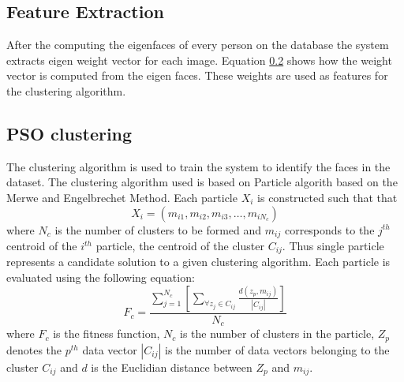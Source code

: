 \documentclass[a4paper,twoside]{article}
\begin{document}
\subsection{Feature Extraction}

After the computing the eigenfaces of every person on the database the system
extracts eigen weight vector for each image. Equation \ref{} shows how the
weight vector is computed from the eigen faces. These weights are used as
features for the clustering algorithm.


\subsection{PSO clustering}
The clustering algorithm is used to train the system to identify the faces in
the dataset. The clustering algorithm used is based on Particle algorith based
on the Merwe and Engelbrechet \cite{psoclustering} Method. Each particle
$X_i$ is constructed such that that
\begin{equation}
X_i=\left( m_{i1}, m_{i2}, m_{i3},\dots, m_{iN_c}\right)
\end{equation}
where $N_c$ is the number of clusters to be formed and $m_{ij}$ corresponds to the $j^{th}$ centroid of the  $i^{th}$ particle, the centroid of the cluster $C_{ij}$. Thus single particle represents a candidate solution to a given clustering algorithm. Each particle is evaluated using the following equation:
\begin{equation}
F_c  = \frac{{\sum\nolimits_{j = 1}^{N_c } {\left[ {\sum\limits_{\forall z_j  \in C_{ij} } {\frac{{d(z_p ,m_{ij} )}}{{\left| {C_{ij} } \right|}}} } \right]} }}{{N_c }}
\end{equation}
where $F_c$ is the fitness function, $N_c$ is the number of clusters in the particle, $Z_p$ denotes the $p^{th}$ data vector $\left| {C_{ij} } \right|$ is the number of data vectors belonging to the cluster $C_{ij}$ and $d$ is the Euclidian distance between $Z_p$ and $m_{ij}$.
\end{document}
